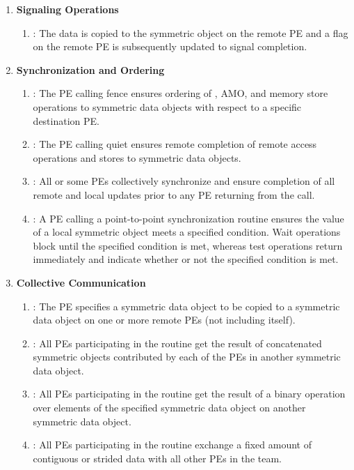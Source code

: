 \begin{enumerate}
\item \textbf{Signaling Operations}
\begin{enumerate}
  \item {}: The \source{} data is copied to the symmetric
        object on the remote \ac{PE} and a flag on the remote \ac{PE} is subsequently
        updated to signal completion.
\end{enumerate}

\item \textbf{Synchronization and Ordering}
\begin{enumerate}
  \item {}: The \ac{PE} calling fence ensures ordering of
  \PUT, \ac{AMO}, and memory store operations
  to symmetric data objects with respect to a specific
      destination \ac{PE}.
  \item {}: The \ac{PE} calling quiet ensures remote completion of remote access
      operations and stores to symmetric data objects.
  \item {}: All or some \acp{PE} collectively synchronize and ensure
      completion of all remote and local updates prior to any \ac{PE} returning
      from the call.
  \item {}: A \ac{PE} calling a point-to-point synchronization
      routine ensures the value of a local symmetric object meets a specified
      condition.  Wait operations block until the specified condition is
      met, whereas test operations return immediately and indicate whether or
      not the specified condition is met.
\end{enumerate}

\item \textbf{Collective Communication}
\begin{enumerate}
  \item {}: The  \ac{PE} specifies a symmetric data
      object to be copied to a symmetric data object on one or more remote
      \acp{PE} (not including itself).
  \item {}: All \acp{PE} participating in the routine get the result
      of concatenated symmetric objects contributed by each of the \acp{PE} in
      another symmetric data object.
  \item {}: All \acp{PE} participating in the routine get the result
      of a binary operation over elements of the specified symmetric
      data object on another symmetric data object.
  \item {}: All \acp{PE} participating in the routine exchange
      a fixed amount of contiguous or strided data with all other \acp{PE}
      in the team.
\end{enumerate}


\end{enumerate}
